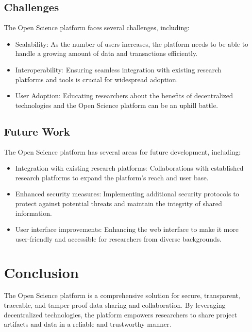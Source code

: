 \documentclass{article}
\begin{document}
\subsection{Challenges}

The Open Science platform faces several challenges, including:

\begin{itemize}
    \item Scalability: As the number of users increases, the platform needs to be able to handle a growing amount of data and transactions efficiently.
    \item Interoperability: Ensuring seamless integration with existing research platforms and tools is crucial for widespread adoption.
    \item User Adoption: Educating researchers about the benefits of decentralized technologies and the Open Science platform can be an uphill battle.
\end{itemize}

\subsection{Future Work}

The Open Science platform has several areas for future development, including:

\begin{itemize}
    \item Integration with existing research platforms: Collaborations with established research platforms to expand the platform's reach and user base.
    \item Enhanced security measures: Implementing additional security protocols to protect against potential threats and maintain the integrity of shared information.
    \item User interface improvements: Enhancing the web interface to make it more user-friendly and accessible for researchers from diverse backgrounds.
\end{itemize}

\section{Conclusion}
The Open Science platform is a comprehensive solution for secure, transparent, traceable, and tamper-proof data sharing and collaboration. By leveraging decentralized technologies, the platform empowers researchers to share project artifacts and data in a reliable and trustworthy manner.
\end{document}
